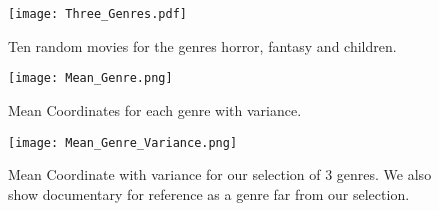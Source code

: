 \begin{figure}[hptb]
\centering
\texttt{[image: Three\_Genres.pdf]}
 \caption{Ten random movies for the genres horror, fantasy and children. }
\label{fig:tg}
\end{figure}

\begin{figure}[hptb]
\centering
\texttt{[image: Mean\_Genre.png]}
 \caption{Mean Coordinates for each genre with variance.}
\label{fig:tgMeanGenre}
\end{figure}

\begin{figure}[hptb]
\centering
\texttt{[image: Mean\_Genre\_Variance.png]}
 \caption{Mean Coordinate with variance for our selection of 3 genres. We also show documentary for reference as a genre far from our selection.}
\label{fig:tgMV}
\end{figure}
